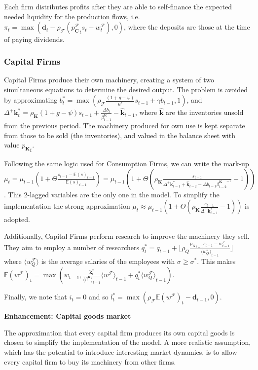 \documentclass[a4paper, headings=standardclasses]{scrartcl}
\numberwithin{equation}{subsection}
\newenvironment{enh}[1][]{\begin{framed}\noindent\textbf{Enhancement: #1}\par}{\end{framed}}
\begin{document}
Each firm distributes profits after they are able to self-finance the expected needed liquidity for the production flows, i.e. $\pi_t = \max(\mathbf{d}_t - \rho_\mathcal{F} ({p^\mathcal{F}_\mathbf{C}}_t s_t - w^\mathcal{F}_t), 0)$, where the deposits are those at the time of paying dividends.


\subsubsection{Capital Firms}
Capital Firms produce their own machinery, creating a system of two simultaneous equations to determine the desired output.
The problem is avoided by approximating $b^*_t = \max(\rho_\mathcal{F}\frac{(1+g-\psi)}{u^*}s_{t-1} + \gamma b_{t-1}, 1)$, and $\Delta^+\mathbf{k}_t^* = \rho_\mathbf{K}(1+g-\psi)s_{t-1} + \frac{{\Delta b}_t}{\beta^\mathbf{K}_{t-1}} - \hat{\mathbf{k}}_{t-1}$, where $\hat{\mathbf{k}}$ are the inventories unsold from the previous period. The machinery produced for own use is kept separate from those to be sold (the inventories), and valued in the balance sheet with value ${p_\mathbf{K}}_t$.

Following the same logic used for Consumption Firms, we can write the mark-up $\mu_t = \mu_{t-1}(1 + \Theta \frac{s_{t-1}-{\mathbb{E}(s)}_{t-1}}{{\mathbb{E}(s)}_{t-1}}) = \mu_{t-1}(1+\Theta(\rho_\mathbf{K}\frac{s_{t-1}}{\Delta^+\mathbf{k}^*_{t-1} + \hat{\mathbf{k}}_{t-2} - \Delta b_{t-1}{\beta^\mathbf{K}_{t-2}}^{-1}}-1))$.
This 2-lagged variables are the only one in the model. To simplify the implementation the strong approximation $\mu_t \approx \mu_{t-1}(1+\Theta(\rho_\mathbf{K}\frac{s_{t-1}}{\Delta^+\mathbf{k}^*_{t-1}}-1))$ is adopted.

Additionally, Capital Firms perform research to improve the machinery they sell. They aim to employ a number of researchers $q_t^* = q_{t-1} + \lfloor \rho_Q\frac{{p_\mathbf{K}}_{t-1}s_{t-1} - w^\mathcal{F}_{t-1}}{{\langle w^\mathcal{F}_Q \rangle}_{t-1}} \rfloor$ where $\langle w^\mathcal{F}_Q \rangle$ is the average salaries of the employees with $\sigma \ge \sigma^*$. This makes $\mathbb{E}(w^\mathcal{F})_t = \max(w_{t-1}, \frac{\mathbf{k}^*_t}{{\langle \beta^\mathbf{K} \rangle}_{t-1}}{\langle w^\mathcal{F} \rangle}_{t-1} + q_t^* {\langle w^\mathcal{F}_Q \rangle}_{t-1})$.

Finally, we note that $i_t = 0$ and so $l_t^* = \max(\rho_\mathcal{F} \mathbb{E}(w^\mathcal{F})_t - \mathbf{d}_{t-1}, 0)$.

\begin{enh}[Capital goods market]
    The approximation that every capital firm produces its own capital goods is chosen to simplify the implementation of the model.
    A more realistic assumption, which has the potential to introduce interesting market dynamics, is to allow every capital firm to buy its machinery from other firms.
\end{enh}
\end{document}
